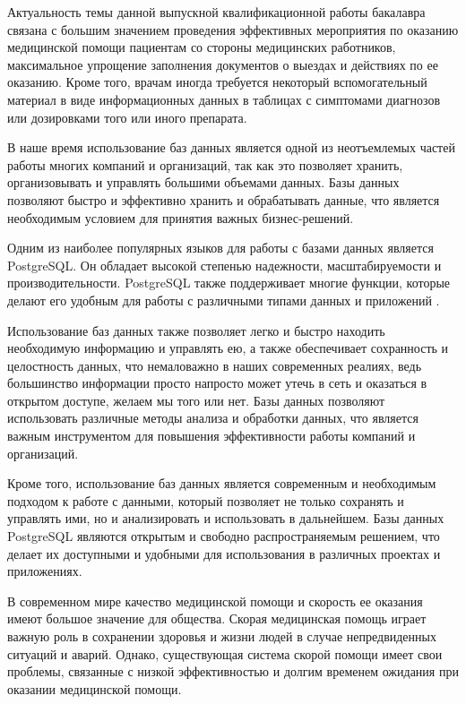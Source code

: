 \introduction %

Актуальность темы данной выпускной квалификационной работы бакалавра связана с большим значением проведения эффективных мероприятия по оказанию медицинской помощи пациентам со стороны медицинских работников, максимальное упрощение заполнения документов о выездах и действиях по ее оказанию. Кроме того, врачам иногда требуется некоторый вспомогательный материал в виде информационных данных в таблицах с симптомами диагнозов или дозировками того или иного препарата.

В наше время использование баз данных является одной из неотъемлемых частей работы многих компаний и организаций, так как это позволяет хранить, организовывать и управлять большими объемами данных. Базы данных позволяют быстро и эффективно хранить и обрабатывать данные, что является необходимым условием для принятия важных бизнес-решений.

Одним из наиболее популярных языков для работы с базами данных является PostgreSQL. Он обладает высокой степенью надежности, масштабируемости и производительности. PostgreSQL также поддерживает многие функции, которые делают его удобным для работы с различными типами данных и приложений \cite{book1}.

Использование баз данных также позволяет легко и быстро находить необходимую информацию и управлять ею, а также обеспечивает сохранность и целостность данных, что немаловажно в наших современных реалиях, ведь большинство информации просто напросто может утечь в сеть и оказаться в открытом доступе, желаем мы того или нет. Базы данных позволяют использовать различные методы анализа и обработки данных, что является важным инструментом для повышения эффективности работы компаний и организаций.

Кроме того, использование баз данных является современным и необходимым подходом к работе с данными, который позволяет не только сохранять и управлять ими, но и анализировать и использовать в дальнейшем. Базы данных PostgreSQL являются открытым и свободно распространяемым решением, что делает их доступными и удобными для использования в различных проектах и приложениях.

В современном мире качество медицинской помощи и скорость ее оказания имеют большое значение для общества. Скорая медицинская помощь играет важную роль в сохранении здоровья и жизни людей в случае непредвиденных ситуаций и аварий. Однако, существующая система скорой помощи имеет свои проблемы, связанные с низкой эффективностью и долгим временем ожидания при оказании медицинской помощи.

